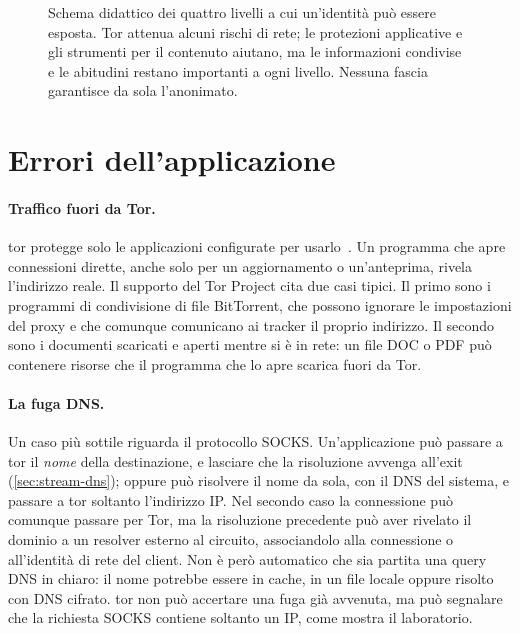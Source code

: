 \begin{figure}[htbp]
\centering

\caption{Schema didattico dei quattro livelli a cui un'identità può essere esposta. Tor attenua alcuni rischi di rete; le protezioni applicative e gli strumenti per il contenuto aiutano, ma le informazioni condivise e le abitudini restano importanti a ogni livello. Nessuna fascia garantisce da sola l'anonimato.}
\label{fig:livelli}
\end{figure}

\section{Errori dell'applicazione}\label{sec:opsec-applicazione}

\paragraph{Traffico fuori da Tor.} tor protegge solo le applicazioni configurate per usarlo~\cite{torsafety}. Un programma che apre connessioni dirette, anche solo per un aggiornamento o un'anteprima, rivela l'indirizzo reale. Il supporto del Tor Project cita due casi tipici. Il primo sono i programmi di condivisione di file BitTorrent, che possono ignorare le impostazioni del proxy e che comunque comunicano ai tracker il proprio indirizzo. Il secondo sono i documenti scaricati e aperti mentre si è in rete: un file DOC o PDF può contenere risorse che il programma che lo apre scarica fuori da Tor.

\paragraph{La fuga DNS.} Un caso più sottile riguarda il protocollo SOCKS. Un'applicazione può passare a tor il \emph{nome} della destinazione, e lasciare che la risoluzione avvenga all'exit (\cref{sec:stream-dns}); oppure può risolvere il nome da sola, con il DNS del sistema, e passare a tor soltanto l'indirizzo IP. Nel secondo caso la connessione può comunque passare per Tor, ma la risoluzione precedente può aver rivelato il dominio a un resolver esterno al circuito, associandolo alla connessione o all'identità di rete del client. Non è però automatico che sia partita una query DNS in chiaro: il nome potrebbe essere in cache, in un file locale oppure risolto con DNS cifrato. tor non può accertare una fuga già avvenuta, ma può segnalare che la richiesta SOCKS contiene soltanto un IP, come mostra il laboratorio.

